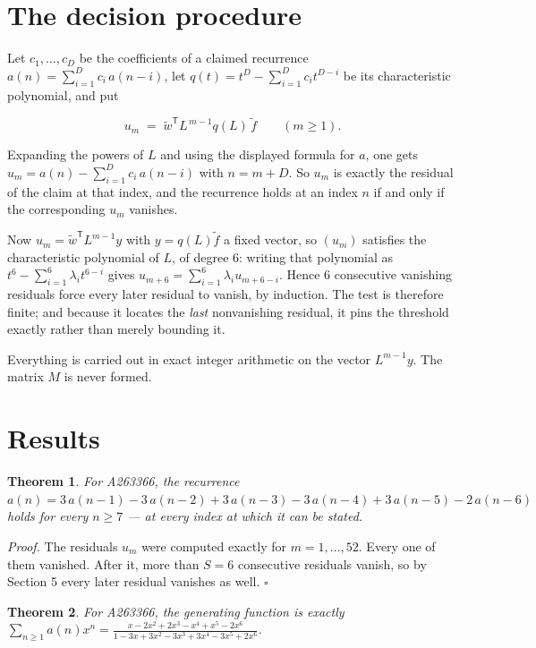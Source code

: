 \documentclass[11pt]{article}
\newtheorem{theorem}{Theorem}
\theoremstyle{definition}
\begin{document}
\section{The decision procedure}

Let $c_1,\dots,c_D$ be the coefficients of a claimed recurrence $a(n) = \sum_{i=1}^{D} c_i\,a(n-i)$, let $q(t) = t^{D} - \sum_{i=1}^{D} c_i t^{D-i}$ be its characteristic polynomial, and put

\[u_m \;=\; \tilde w^{\mathsf T} L^{\,m-1} q(L)\,\tilde f \qquad (m \ge 1).\]

Expanding the powers of $L$ and using the displayed formula for $a$, one gets $u_m = a(n) - \sum_{i=1}^{D} c_i\,a(n-i)$ with $n = m + D$. So $u_m$ is exactly the residual of the claim at that index, and the recurrence holds at an index $n$ if and only if the corresponding $u_m$ vanishes.

Now $u_m = \tilde w^{\mathsf T} L^{m-1} y$ with $y = q(L)\tilde f$ a fixed vector, so $(u_m)$ satisfies the characteristic polynomial of $L$, of degree $6$: writing that polynomial as $t^{6} - \sum_{i=1}^{6} \lambda_i t^{6-i}$ gives $u_{m+6} = \sum_{i=1}^{6} \lambda_i u_{m+6-i}$. Hence $6$ consecutive vanishing residuals force every later residual to vanish, by induction. The test is therefore finite; and because it locates the {\itshape last} nonvanishing residual, it pins the threshold exactly rather than merely bounding it.

Everything is carried out in exact integer arithmetic on the vector $L^{m-1}y$. The matrix $M$ is never formed.

\section{Results}

\begin{theorem} For A263366, the recurrence $a(n) = 3\,a(n-1) - 3\,a(n-2) + 3\,a(n-3) - 3\,a(n-4) + 3\,a(n-5) - 2\,a(n-6)$ holds for every $n \ge 7$ --- at every index at which it can be stated.\end{theorem}

{\itshape Proof.} The residuals $u_m$ were computed exactly for $m = 1,\dots,52$. Every one of them vanished. After it, more than $S = 6$ consecutive residuals vanish, so by Section 5 every later residual vanishes as well. $\square$

\begin{theorem} For A263366, the generating function is exactly $\sum_{n\ge 1} a(n)x^n = \frac{x - 2x^{2} + 2x^{3} - x^{4} + x^{5} - 2x^{6}}{1 - 3x + 3x^{2} - 3x^{3} + 3x^{4} - 3x^{5} + 2x^{6}}$.\end{theorem}
\end{document}

